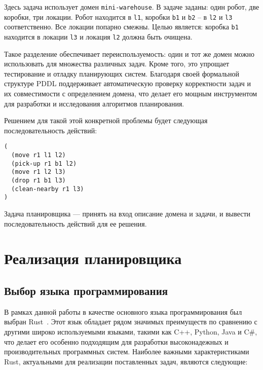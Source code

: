 \documentclass{article}
\begin{document}
\begin{enumerate}
  Здесь задача использует домен \texttt{mini-warehouse}. 
  В задаче заданы: один робот, две коробки, три локации.
  Робот находится в \texttt{l1}, коробки \texttt{b1} и \texttt{b2} -- в \texttt{l2} и \texttt{l3} соответственно.
  Все локации попарно смежны.
  Целью является: коробка \texttt{b1} находится в локации \texttt{l3} и локация \texttt{l2} должна быть очищена.
\end{enumerate}

Такое разделение обеспечивает переиспользуемость:
один и тот же домен можно использовать для множества различных задач.
Кроме того, это упрощает тестирование и отладку планирующих систем.
Благодаря своей формальной структуре PDDL поддерживает автоматическую проверку корректности задач
и их совместимости с определением домена,
что делает его мощным инструментом для разработки и исследования алгоритмов планирования.

Решением для такой этой конкретной проблемы будет следующая последовательность действий:
\begin{verbatim}
(
  (move r1 l1 l2)
  (pick-up r1 b1 l2)
  (move r1 l2 l3)
  (drop r1 b1 l3)
  (clean-nearby r1 l3)
)
\end{verbatim}

Задача планировщика --- принять на вход описание домена и задачи, и вывести последовательность действий для ее решения.

\section{Реализация планировщика}

\subsection{Выбор языка программирования}

В рамках данной работы в качестве основного языка программирования был выбран Rust~\cite{rust}.
Этот язык обладает рядом значимых преимуществ по сравнению с другими широко используемыми языками,
такими как C++, Python, Java и C\#,
что делает его особенно подходящим для разработки высоконадежных и производительных программных систем.
Наиболее важными характеристиками Rust, актуальными для реализации поставленных задач, являются следующие:
\end{document}

